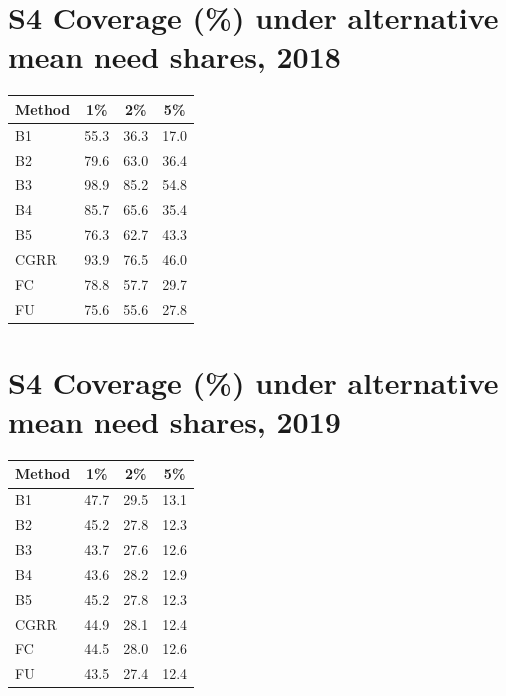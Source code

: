 \documentclass[10pt]{article}
\begin{document}
\section*{S4 Coverage (\%) under alternative mean need shares, 2018}\begin{tabular}{lccc}\toprule Method & 1\% & 2\% & 5\%\\\midrule
B1 & 55.3 & 36.3 & 17.0\\
B2 & 79.6 & 63.0 & 36.4\\
B3 & 98.9 & 85.2 & 54.8\\
B4 & 85.7 & 65.6 & 35.4\\
B5 & 76.3 & 62.7 & 43.3\\
CGRR & 93.9 & 76.5 & 46.0\\
FC & 78.8 & 57.7 & 29.7\\
FU & 75.6 & 55.6 & 27.8\\
\bottomrule\end{tabular}
\section*{S4 Coverage (\%) under alternative mean need shares, 2019}\begin{tabular}{lccc}\toprule Method & 1\% & 2\% & 5\%\\\midrule
B1 & 47.7 & 29.5 & 13.1\\
B2 & 45.2 & 27.8 & 12.3\\
B3 & 43.7 & 27.6 & 12.6\\
B4 & 43.6 & 28.2 & 12.9\\
B5 & 45.2 & 27.8 & 12.3\\
CGRR & 44.9 & 28.1 & 12.4\\
FC & 44.5 & 28.0 & 12.6\\
FU & 43.5 & 27.4 & 12.4\\
\bottomrule\end{tabular}
\end{document}
